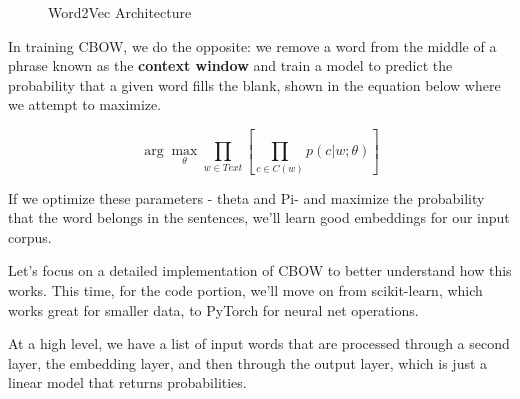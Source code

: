 \documentclass[11pt, table]{diazessay} %
\begin{document}
\begin{sloppypar}
\begin{figure}[H]
        \caption{Word2Vec Architecture}
      \end{figure}

In training CBOW, we do the opposite: we remove a word from the middle of a phrase known as the \textbf{context window} and train  a model to predict the probability that a given word fills the blank, shown in the equation below where we attempt to maximize. 

\begin{equation}
\arg\max_\theta \prod_{w\in Text}\left[\prod_{c \in C(w)} p(c|w;\theta)\right]
\end{equation}

If we optimize these parameters - theta and Pi-  and maximize the probability that the word belongs in the sentences, we'll learn good embeddings for our input corpus. 

Let's focus on a detailed implementation of CBOW to better understand how this works. This time, for the code portion, we'll move on from scikit-learn, which works great for smaller data, to PyTorch for neural net operations.  

At a high level, we have a list of input words that are processed through a second layer, the embedding layer, and then through the output layer, which is just a linear model that returns probabilities. 

\def\layersep{2.5cm}
 \begin{figure}[H]
\end{figure}
\end{sloppypar}
\end{document}
